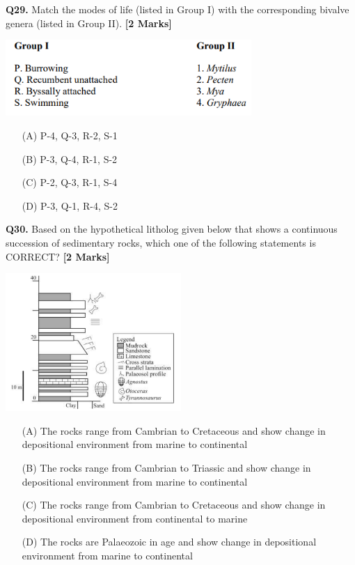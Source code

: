 \documentclass[11pt]{article}
\newcommand{\questionb}[2]{
    \noindent\textbf{Q#2.} #1 \hfill \textbf{[2 Marks]}
}
\begin{document}
\questionb{Match the modes of life (listed in Group I) with the corresponding bivalve genera (listed in Group II).}{29}
\begin{center}
\includegraphics[width=0.7\textwidth]{figures/29.png}
\end{center}
\begin{enumerate}
    \item[(A)] P-4, Q-3, R-2, S-1
    \item[(B)] P-3, Q-4, R-1, S-2
    \item[(C)] P-2, Q-3, R-1, S-4
    \item[(D)] P-3, Q-1, R-4, S-2
\end{enumerate}
\vspace{0.5cm}

\questionb{Based on the hypothetical litholog given below that shows a continuous succession of sedimentary rocks, which one of the following statements is CORRECT?}{30}
\begin{center}
\includegraphics[width=0.5\textwidth]{figures/30}
\end{center}
\begin{enumerate}
    \item[(A)] The rocks range from Cambrian to Cretaceous and show change in depositional environment from marine to continental
    \item[(B)] The rocks range from Cambrian to Triassic and show change in depositional environment from marine to continental
    \item[(C)] The rocks range from Cambrian to Cretaceous and show change in depositional environment from continental to marine
    \item[(D)] The rocks are Palaeozoic in age and show change in depositional environment from marine to continental
\end{enumerate}
\vspace{0.5cm}
\end{document}

